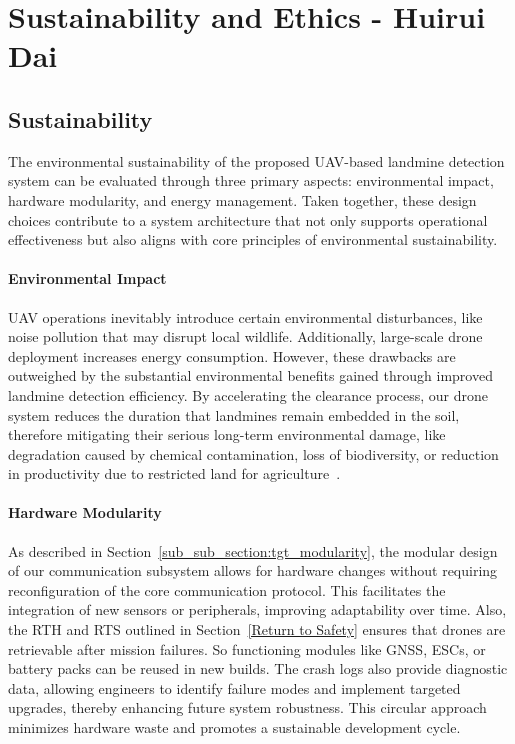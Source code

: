 \newpage
{}
\setlength{\parindent}{0pt}

\section{Sustainability and Ethics - Huirui Dai} \label{sustainability_ethics}


\subsection{Sustainability}\label{sustainability}

The environmental sustainability of the proposed \gls{UAV}-based landmine detection system can be evaluated through three primary aspects: environmental impact, hardware modularity, and energy management. Taken together, these design choices contribute to a system architecture that not only supports operational effectiveness but also aligns with core principles of environmental sustainability.

\paragraph{Environmental Impact}

\gls{UAV} operations inevitably introduce certain environmental disturbances, like noise pollution that may disrupt local wildlife. Additionally, large-scale drone deployment increases energy consumption. However, these drawbacks are outweighed by the substantial environmental benefits gained through improved landmine detection efficiency. By accelerating the clearance process, our drone system reduces the duration that landmines remain embedded in the soil, therefore mitigating their serious long-term environmental damage, like degradation caused by chemical contamination, loss of biodiversity, or reduction in productivity due to restricted land for agriculture~\cite{eniang2007impacts}.

\paragraph{Hardware Modularity}

As described in Section~\ref{sub_sub_section:tgt_modularity}, the modular design of our communication subsystem allows for hardware changes without requiring reconfiguration of the core communication protocol. This facilitates the integration of new sensors or peripherals, improving adaptability over time. Also, the \gls{RTH} and \gls{RTS} outlined in Section~\ref{Return to Safety} ensures that drones are retrievable after mission failures. So functioning modules like GNSS, ESCs, or battery packs can be reused in new builds. The crash logs also provide diagnostic data, allowing engineers to identify failure modes and implement targeted upgrades, thereby enhancing future system robustness. This circular approach minimizes hardware waste and promotes a sustainable development cycle.

